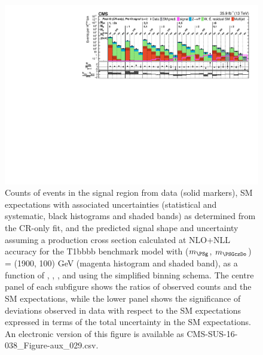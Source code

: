 \begin{figure}[p]
    \begin{center}
        \includegraphics[width=1.00\textwidth]{Supplementary/CMS-SUS-16-038_Figure-aux_029.pdf}
  \caption{Counts of events in the signal region from data (solid markers), SM expectations
    with associated uncertainties (statistical and systematic, black
    histograms and shaded bands) as determined from the CR-only fit,
    and the predicted signal shape and uncertainty assuming a production cross
    section calculated at NLO+NLL accuracy for the
        T1bbbb benchmark model with ($m_{\PSg}$, $m_{\PSGczDo}$) = (1900, 100) GeV
    (magenta histogram and shaded band),
    as a function of \njet, \nb, \scalht, and \mht using the simplified binning schema.
    The centre panel of each subfigure shows the ratios of
    observed counts and the SM expectations, while the lower panel
    shows the significance of deviations observed in data with respect
    to the SM expectations expressed in terms of the total uncertainty
    in the SM expectations.  
	An electronic version of this figure is available as CMS-SUS-16-038\_Figure-aux\_029.csv.
        }
        \label{fig:T1bbbb_1900_100_MR_sig}
    \end{center}
\end{figure}

